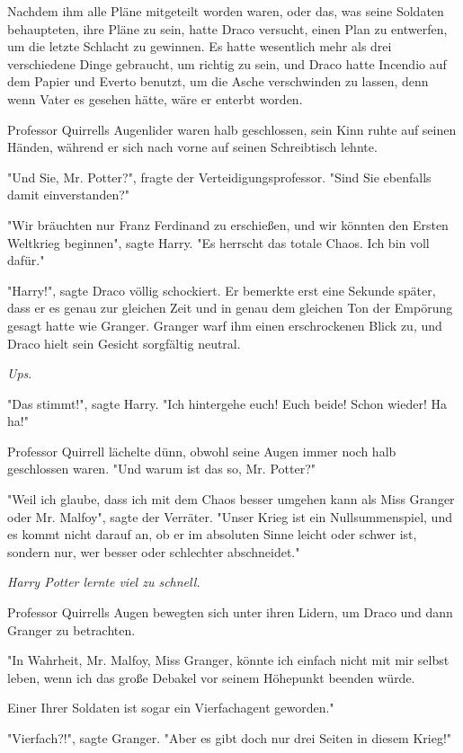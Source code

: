 {Nachdem ihm alle Pläne mitgeteilt worden waren, oder das, was seine Soldaten behaupteten, ihre Pläne zu sein, hatte Draco versucht, einen Plan zu entwerfen, um die letzte Schlacht zu gewinnen. Es hatte wesentlich mehr als drei verschiedene Dinge gebraucht, um richtig zu sein, und Draco hatte Incendio auf dem Papier und Everto benutzt, um die Asche verschwinden zu lassen, denn wenn Vater es gesehen hätte, wäre er enterbt worden.

Professor Quirrells Augenlider waren halb geschlossen, sein Kinn ruhte auf seinen Händen, während er sich nach vorne auf seinen Schreibtisch lehnte.

"Und Sie, Mr. Potter?", fragte der Verteidigungsprofessor. "Sind Sie ebenfalls damit einverstanden?"

"Wir bräuchten nur Franz Ferdinand zu erschießen, und wir könnten den Ersten Weltkrieg beginnen", sagte Harry. "Es herrscht das totale Chaos. Ich bin voll dafür."

"Harry!", sagte Draco völlig schockiert. Er bemerkte erst eine Sekunde später, dass er es genau zur gleichen Zeit und in genau dem gleichen Ton der Empörung gesagt hatte wie Granger. Granger warf ihm einen erschrockenen Blick zu, und Draco hielt sein Gesicht sorgfältig neutral.

\emph{Ups}.

"Das stimmt!", sagte Harry. "Ich hintergehe euch! Euch beide! Schon wieder! Ha ha!"

Professor Quirrell lächelte dünn, obwohl seine Augen immer noch halb geschlossen waren. "Und warum ist das so, Mr. Potter?"

"Weil ich glaube, dass ich mit dem Chaos besser umgehen kann als Miss Granger oder Mr. Malfoy", sagte der Verräter. "Unser Krieg ist ein Nullsummenspiel, und es kommt nicht darauf an, ob er im absoluten Sinne leicht oder schwer ist, sondern nur, wer besser oder schlechter abschneidet."

\emph{Harry Potter lernte viel zu schnell.}

Professor Quirrells Augen bewegten sich unter ihren Lidern, um Draco und dann Granger zu betrachten.

"In Wahrheit, Mr. Malfoy, Miss Granger, könnte ich einfach nicht mit mir selbst leben, wenn ich das große Debakel vor seinem Höhepunkt beenden würde.

Einer Ihrer Soldaten ist sogar ein Vierfachagent geworden."

"Vierfach?!", sagte Granger. "Aber es gibt doch nur drei Seiten in diesem Krieg!"

}
